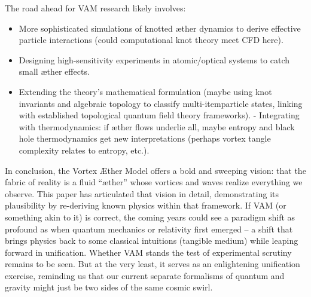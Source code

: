 \documentclass[a4paper,12pt]{article}
\begin{document}
    The road ahead for VAM research likely involves:
    \begin{itemize}
    \item More sophisticated simulations of knotted æther dynamics to derive effective particle interactions (could computational knot theory meet CFD here).
    \item Designing high-sensitivity experiments in atomic/optical systems to catch small æther effects.
    \item Extending the theory’s mathematical formulation (maybe using knot invariants and algebraic topology to classify multi-itemparticle states, linking with established topological quantum field theory frameworks).
    - Integrating with thermodynamics: if æther flows underlie all, maybe entropy and black hole thermodynamics get new interpretations (perhaps vortex tangle complexity relates to entropy, etc.).
\end{itemize}
    In conclusion, the Vortex Æther Model offers a bold and sweeping vision: that the fabric of reality is a fluid “æther” whose vortices and waves realize everything we observe. This paper has articulated that vision in detail, demonstrating its plausibility by re-deriving known physics within that framework. If VAM (or something akin to it) is correct, the coming years could see a paradigm shift as profound as when quantum mechanics or relativity first emerged – a shift that brings physics back to some classical intuitions (tangible medium) while leaping forward in unification. Whether VAM stands the test of experimental scrutiny remains to be seen. But at the very least, it serves as an enlightening unification exercise, reminding us that our current separate formalisms of quantum and gravity might just be two sides of the same cosmic swirl.
\end{document}
